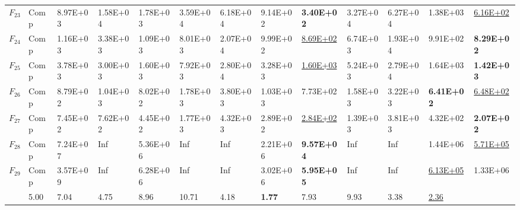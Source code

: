 \begin{table}
\begin{tabular}{cl*{10}{R{1.60cm}}R{1.70cm}}
$F_{23}$ & Comp & 8.97E+03 & 1.58E+04 & 1.78E+03 & 3.59E+04 & 6.18E+04 & 9.14E+02 & \textbf{3.40E+02} & 3.27E+04 & 6.27E+04 & 1.38E+03 & \underline{6.16E+02}\\
$F_{24}$ & Comp & 1.16E+03 & 3.38E+03 & 1.09E+03 & 8.01E+03 & 2.07E+04 & 9.99E+02 & \underline{8.69E+02} & 6.74E+03 & 1.93E+04 & 9.91E+02 & \textbf{8.29E+02}\\
$F_{25}$ & Comp & 3.78E+03 & 3.00E+03 & 1.60E+03 & 7.92E+03 & 2.80E+04 & 3.28E+03 & \underline{1.60E+03} & 5.24E+03 & 2.79E+04 & 1.64E+03 & \textbf{1.42E+03}\\
$F_{26}$ & Comp & 8.79E+02 & 1.04E+03 & 8.02E+02 & 1.78E+03 & 3.80E+03 & 1.03E+03 & 7.73E+02 & 1.58E+03 & 3.22E+03 & \textbf{6.41E+02} & \underline{6.48E+02}\\
$F_{27}$ & Comp & 7.45E+02 & 7.62E+02 & 4.45E+02 & 1.77E+03 & 4.32E+03 & 2.89E+02 & \underline{2.84E+02} & 1.39E+03 & 3.81E+03 & 4.32E+02 & \textbf{2.07E+02}\\
$F_{28}$ & Comp & 7.24E+07 & Inf & 5.36E+06 & Inf & Inf & 2.21E+06 & \textbf{9.57E+04} & Inf & Inf & 1.44E+06 & \underline{5.71E+05}\\
$F_{29}$ & Comp & 3.57E+09 & Inf & 6.28E+06 & Inf & Inf & 3.02E+06 & \textbf{5.95E+05} & Inf & Inf & \underline{6.13E+05} & 1.33E+06\\
\midrule
{} & 5.00 & 7.04 & 4.75 & 8.96 & 10.71 & 4.18 & \textbf{1.77} & 7.93 & 9.93 & 3.38 & \underline{2.36}\\
\bottomrule
\end{tabular}
\end{table}
